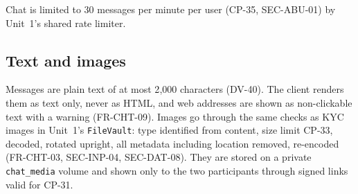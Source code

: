 \documentclass[11pt,a4paper]{article}
\begin{document}
Chat is limited to 30 messages per minute per user (CP-35, SEC-ABU-01) by Unit~1's shared rate limiter.

\subsection{Text and images}
\label{sec:images}
Messages are plain text of at most 2{,}000 characters (DV-40). The client renders them as text only, never as HTML, and web addresses are shown as non-clickable text with a warning (FR-CHT-09). Images go through the same checks as KYC images in Unit~1's \texttt{FileVault}: type identified from content, size limit CP-33, decoded, rotated upright, all metadata including location removed, re-encoded (FR-CHT-03, SEC-INP-04, SEC-DAT-08). They are stored on a private \texttt{chat\_media} volume and shown only to the two participants through signed links valid for CP-31.
\end{document}
